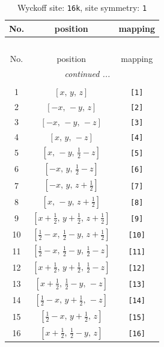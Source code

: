 \documentclass[fleqn,8pt]{jsarticle}
\begin{document}
\begin{longtable}{ccc}
\caption{Wyckoff site: {\tt 16k}, site symmetry: {\tt 1}}
 \\
 \hline \hline
No. & position & mapping \\ \hline \endfirsthead

\multicolumn{2}{l}{\tablename\ \thetable{}} \\
 \hline \hline
No. & position & mapping \\ \hline \endhead

 \hline \hline
\multicolumn{2}{r}{\footnotesize\it continued ...} \\ \endfoot

 \hline \hline
\multicolumn{2}{r}{} \\ \endlastfoot

1 & $\left[ x,\, y,\, z \right]$ & {\tt [1]} \\ \hline
2 & $\left[ - x,\, - y,\, z \right]$ & {\tt [2]} \\ \hline
3 & $\left[ - x,\, - y,\, - z \right]$ & {\tt [3]} \\ \hline
4 & $\left[ x,\, y,\, - z \right]$ & {\tt [4]} \\ \hline
5 & $\left[ x,\, - y,\, \frac{1}{2} - z \right]$ & {\tt [5]} \\ \hline
6 & $\left[ - x,\, y,\, \frac{1}{2} - z \right]$ & {\tt [6]} \\ \hline
7 & $\left[ - x,\, y,\, z + \frac{1}{2} \right]$ & {\tt [7]} \\ \hline
8 & $\left[ x,\, - y,\, z + \frac{1}{2} \right]$ & {\tt [8]} \\ \hline
9 & $\left[ x + \frac{1}{2},\, y + \frac{1}{2},\, z + \frac{1}{2} \right]$ & {\tt [9]} \\ \hline
10 & $\left[ \frac{1}{2} - x,\, \frac{1}{2} - y,\, z + \frac{1}{2} \right]$ & {\tt [10]} \\ \hline
11 & $\left[ \frac{1}{2} - x,\, \frac{1}{2} - y,\, \frac{1}{2} - z \right]$ & {\tt [11]} \\ \hline
12 & $\left[ x + \frac{1}{2},\, y + \frac{1}{2},\, \frac{1}{2} - z \right]$ & {\tt [12]} \\ \hline
13 & $\left[ x + \frac{1}{2},\, \frac{1}{2} - y,\, - z \right]$ & {\tt [13]} \\ \hline
14 & $\left[ \frac{1}{2} - x,\, y + \frac{1}{2},\, - z \right]$ & {\tt [14]} \\ \hline
15 & $\left[ \frac{1}{2} - x,\, y + \frac{1}{2},\, z \right]$ & {\tt [15]} \\ \hline
16 & $\left[ x + \frac{1}{2},\, \frac{1}{2} - y,\, z \right]$ & {\tt [16]} \\
\end{longtable}
\end{document}
